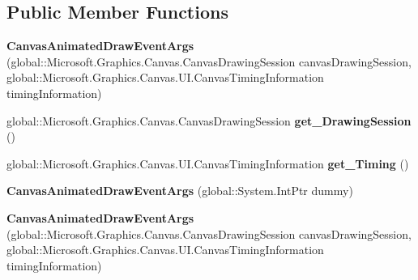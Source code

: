 \subsection*{Public Member Functions}
\begin{DoxyCompactItemize}
\item 
\mbox{\label{class_microsoft_1_1_graphics_1_1_canvas_1_1_u_i_1_1_xaml_1_1_canvas_animated_draw_event_args_aac93ec47171428d3e94ed6fe14583c9b}} 
{\bfseries Canvas\+Animated\+Draw\+Event\+Args} (global\+::\+Microsoft.\+Graphics.\+Canvas.\+Canvas\+Drawing\+Session canvas\+Drawing\+Session, global\+::\+Microsoft.\+Graphics.\+Canvas.\+U\+I.\+Canvas\+Timing\+Information timing\+Information)
\item 
\mbox{\label{class_microsoft_1_1_graphics_1_1_canvas_1_1_u_i_1_1_xaml_1_1_canvas_animated_draw_event_args_abbbe03755eef9ce5bdf4d9c05a8f521d}} 
global\+::\+Microsoft.\+Graphics.\+Canvas.\+Canvas\+Drawing\+Session {\bfseries get\+\_\+\+Drawing\+Session} ()
\item 
\mbox{\label{class_microsoft_1_1_graphics_1_1_canvas_1_1_u_i_1_1_xaml_1_1_canvas_animated_draw_event_args_a22d34a76080b643c84026f8d7acaf7dc}} 
global\+::\+Microsoft.\+Graphics.\+Canvas.\+U\+I.\+Canvas\+Timing\+Information {\bfseries get\+\_\+\+Timing} ()
\item 
\mbox{\label{class_microsoft_1_1_graphics_1_1_canvas_1_1_u_i_1_1_xaml_1_1_canvas_animated_draw_event_args_abfa7204a8fa459825847e3dc689bea45}} 
{\bfseries Canvas\+Animated\+Draw\+Event\+Args} (global\+::\+System.\+Int\+Ptr dummy)
\item 
\mbox{\label{class_microsoft_1_1_graphics_1_1_canvas_1_1_u_i_1_1_xaml_1_1_canvas_animated_draw_event_args_aac93ec47171428d3e94ed6fe14583c9b}} 
{\bfseries Canvas\+Animated\+Draw\+Event\+Args} (global\+::\+Microsoft.\+Graphics.\+Canvas.\+Canvas\+Drawing\+Session canvas\+Drawing\+Session, global\+::\+Microsoft.\+Graphics.\+Canvas.\+U\+I.\+Canvas\+Timing\+Information timing\+Information)

\end{DoxyCompactItemize}
